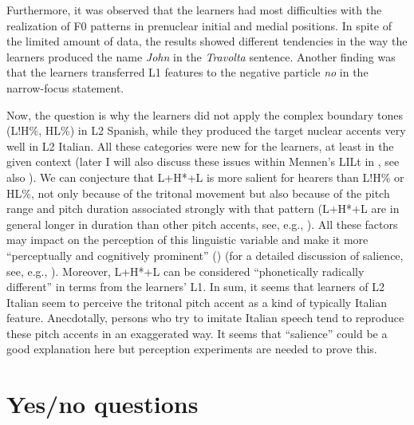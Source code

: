 Furthermore, it was observed that the learners had most difficulties with the realization of F0 patterns in prenuclear initial and medial positions. In spite of the limited amount of data, the results showed different tendencies in the way the learners produced the name \textit{John} in the \textit{Travolta}{} sentence. Another finding was that the learners transferred L1 features to the negative particle \textit{no} in the narrow-focus statement.


Now, the question is why the learners did not apply the complex boundary tones (L!H\%, HL\%) in L2 Spanish, while they produced the target nuclear accents very well in L2 Italian. All these categories were new for the learners, at least in the given context (later I will also discuss these issues within Mennen’s LILt in , see also \citealt{Pešková2022b}). We can conjecture that L+H*+L is more salient for hearers than L!H\% or HL\%, not only because of the tritonal movement but also because of the pitch range and pitch duration associated strongly with that pattern (L+H*+L are in general longer in duration than other pitch accents, see, e.g., \citealt{PeškováEtAl2012}). All these factors may impact on the perception of this linguistic variable and make it more “perceptually and cognitively prominent” (\citealt[81]{KerswillWilliams2002}) (for a detailed discussion of salience, see, e.g., \citealt{MacLeod2015}). Moreover, L+H*+L can be considered “phonetically radically different” in  terms from the learners’ L1. In sum, it seems that learners of L2 Italian seem to perceive the tritonal pitch accent as a kind of typically Italian feature. Anecdotally, persons who try to imitate Italian speech tend to reproduce these pitch accents in an exaggerated way. It seems that “salience” could be a good explanation here but perception experiments are needed to prove this.


\section{Yes/no questions}\label{sec:4.3} %

